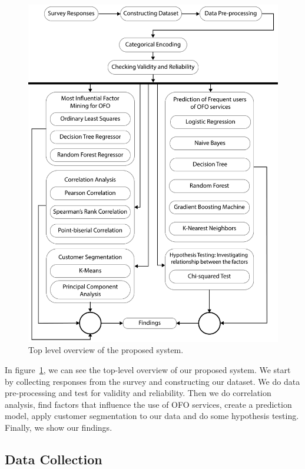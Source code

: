 \documentclass[a4paper,fleqn]{cas-sc}
\begin{document}
\begin{figure}[htb]
  \centering
  \includegraphics[scale = 0.25]{figs/workplan_v4.pdf}
  \caption{Top level overview of the proposed system.}
  \label{fig:workplan}
\end{figure}

In figure~\ref{fig:workplan}, we can see the top-level overview of our proposed system. We start by collecting responses from the survey and constructing our dataset. We do data pre-processing and test for validity and reliability. Then we do correlation analysis, find factors that influence the use of OFO services, create a prediction model, apply customer segmentation to our data and do some hypothesis testing. Finally, we show our findings.

\subsection{Data Collection}
\end{document}
